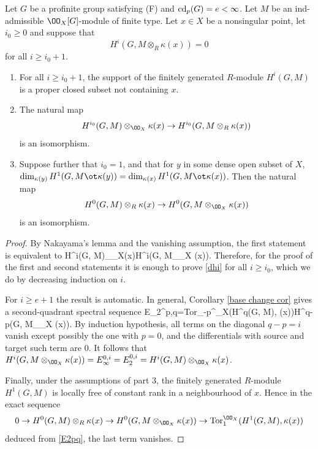 \begin{prop}
\notready\label{torss} Let $G$ be a profinite group satisfying (F) and ${\rm cd}_{p}(G)=e<\infty$. Let $M$  be an ind-admissible $\OO_{X}[G]$-module of finite type. Let  $x\in X$ be a nonsingular point, let $i_{0}\geq 0$  and suppose that
$$H^{i}(G, M\otimes_{R}\kappa(x))=0$$
for all $i\geq i_{0}+1$.
\begin{enumerate}
\item For all $i\geq i_{0}+1$, the support of the finitely generated $R$-module $H^{i}(G, M)$ is a proper closed subset not containing $x$.
\item The natural map
$$H^{i_{0}}(G, M)\otimes_{\OO_{X}}\kappa(x)\to H^{i_{0}}(G, M\otimes_{R} \kappa(x))$$
is an isomorphism.
\item{} Suppose further  that $i_{0}=1$,  and that for $y$ in some dense open subset of $X$,  $\dim _{\kappa(y)} H^{1}(G, M\ot\kappa(y))= \dim _{\kappa(x)} H^{1}(G, M\ot\kappa(x))$. Then the natural map
$$H^{{0}}(G, M)\otimes_{R}\kappa(x)\to H^{{0}}(G, M\otimes_{\OO_{X}} \kappa(x))$$
is an isomorphism.
\end{enumerate}
\end{prop}
\begin{proof}  By Nakayama's lemma  and the vanishing assumption, the first statement is equivalent to
\beq \label{dhi}
H^{i}(G, M)\otimes_{\OO_{X}}\kappa(x)\cong H^{i}(G, M\otimes_{\OO_{X}} \kappa(x)).
\eeq
Therefore, for the proof of the first and second statements  it is enough to prove  \eqref{dhi}  for all $i\geq i_{0}$, which we do by decreasing induction on $i$.

 For $i\geq e+1$ the result is automatic. In general, Corollary  \ref{base change cor} gives a second-quadrant spectral sequence
\beq {}
E_{2}^{p,q}={\rm Tor}_{-p}^{\OO_{X}}(H^{q}(G, M),  \kappa(x))\Rightarrow H^{q-p}(G, M\otimes_{\OO_{X}} \kappa(x)).\eeq
By induction hypothesis, all terms on the diagonal  $q-p=i$ vanish except possibly  the one with $p=0$, and the differentials with source and target such term are $0$. It follows that $H^{i}(G, M\otimes_{\OO_{X} }\kappa(x))=E_{\infty }^{0, i}=E_{2}^{0, i}=H^{i}(G, M)\otimes_{\OO_{X}}\kappa(x) $.

Finally, under the assumptions of part 3, the finitely generated $R$-module $H^{1}(G, M)$ is locally free of constant rank in a neighbourhood of $x$. Hence in the exact sequence
$$0\to H^{{0}}(G, M)\otimes_{R}\kappa(x)\to H^{0}(G, M\otimes_{\OO_{X}} \kappa(x)) \to {\rm Tor}_{1}^{\OO_{X}}(H^{1}(G, M), \kappa(x))$$
deduced from \eqref{E2pq}, the last term vanishes.
\end{proof}



